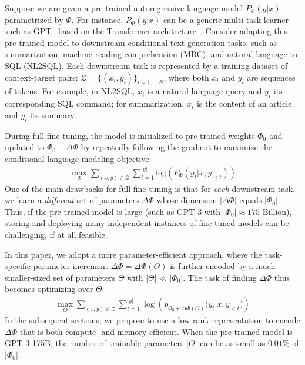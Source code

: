 \documentclass{article} %
\begin{document}
\newcommand{\cZ}{\mathcal{Z}}
Suppose we are given a pre-trained autoregressive language model $P_\Phi(y|x)$ parametrized by $\Phi$.
For instance, $P_\Phi(y|x)$ can be a generic multi-task learner such as GPT~\citep{radford_language_nodate,brown_language_2020} based on the Transformer architecture~\citep{vaswani2017attention}.
Consider adapting this pre-trained model to downstream conditional text generation tasks, such as summarization, machine reading comprehension (MRC), and natural language to SQL (NL2SQL).
Each downstream task is represented by a training dataset of context-target pairs: $\cZ = \{(x_i, y_i)\}_{i=1,..,N}$, where both $x_i$ and $y_i$ are sequences of tokens.
For example, in NL2SQL, $x_i$ is a natural language query and $y_i$ its corresponding SQL command; for summarization, $x_i$ is the content of an article and $y_i$ its summary.

During full fine-tuning, the model is initialized to pre-trained weights $\Phi_0$ and updated to $\Phi_0+\Delta \Phi$ by repeatedly following the gradient to maximize the conditional language modeling objective:
\begin{align}
    \max_{\Phi} \sum_{(x,y)\in\cZ} \sum_{t=1}^{|y|}  \text{log} \left(  P_{\Phi}(y_{t} | x, y_{<t}) \right)
\label{eq:ft_obj}
\end{align}
One of the main drawbacks for full fine-tuning is that for \emph{each} downstream task, we learn a \emph{different} set of parameters $\Delta\Phi$ whose dimension $|\Delta\Phi|$ equals $|\Phi_0|$. 
Thus, if the pre-trained model is large (such as GPT-3 with $|\Phi_0|\approx175 \text{~Billion}$), storing and deploying many independent instances of fine-tuned models can be challenging, if at all feasible. 

In this paper, we adopt a more parameter-efficient approach, where the task-specific parameter increment $\Delta\Phi = \Delta\Phi(\Theta)$ is further encoded by a much smaller-sized set of parameters $\Theta$ with $|\Theta| \ll |\Phi_0|$.
The task of finding $\Delta\Phi$ thus becomes optimizing over $\Theta$:
\begin{align}
    \max_{\Theta} \sum_{(x,y)\in\cZ}  \sum_{t=1}^{|y|}  \log\left({p_{\Phi_0+\Delta\Phi(\Theta)}(y_{t} | x, y_{<t}})\right)
\label{eq:ft_add}
\end{align}
In the subsequent sections, we propose to use a low-rank representation to encode $\Delta\Phi$ that is both compute- and memory-efficient.
When the pre-trained model is GPT-3 175B, the number of trainable parameters $|\Theta|$ can be as small as $0.01\%$ of $|\Phi_0|$. %
\end{document}
